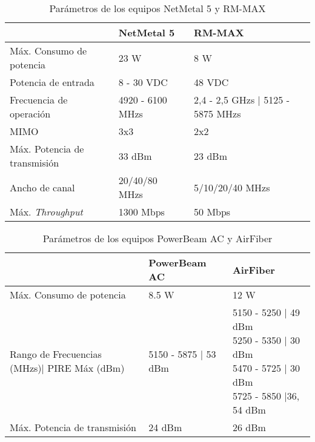 \begin{table}[H]
	\begin{center}
		\begin{tabular}{|l|l|l|}
			\hline
			 & NetMetal 5 & RM-MAX\\
			\hline 
		Máx. Consumo de potencia  & 23 W & 8 W \\ \hline
		Potencia de entrada & 8 - 30 VDC & 48 VDC \\ \hline
		Frecuencia de operación & 4920 - 6100 MHzs & 2,4 - 2,5 GHzs | 5125 - 5875 MHzs  \\ \hline
		MIMO & 3x3 & 2x2 \\ \hline
		Máx. Potencia de transmisión & 33 dBm & 23 dBm \\ \hline
		Ancho de canal & 20/40/80 MHzs & 5/10/20/40 MHzs \\ \hline
		Máx. \textit{Throughput} & 1300 Mbps & 50 Mbps \\ \hline
		\end{tabular}
	\end{center}
	\caption{Parámetros de los equipos NetMetal 5 y RM-MAX}
	\label{table:parámetrosEquipos}
\end{table}

\begin{table}[H]
	\begin{center}
		\begin{tabular}{|l|l|l|}
			\hline
			 & PowerBeam AC & AirFiber\\
			\hline 
		Máx. Consumo de potencia  & 8.5 W & 12 W \\ \hline
	    Rango de Frecuencias (MHzs)| PIRE Máx (dBm)  & 5150 - 5875 | 53 dBm & \makecell{5150 - 5250 | 49 dBm \\ 5250 - 5350 | 30 dBm \\ 5470 - 5725 | 30 dBm \\ 5725 - 5850 |36, 54 dBm } \\ \hline
	    
		Máx. Potencia de transmisión & 24 dBm & 26 dBm \\ \hline
		\end{tabular}
	\end{center}
	\caption{Parámetros de los equipos PowerBeam AC y AirFiber}
	\label{table:parámetrosEquiposUbiquiti}
\end{table}

